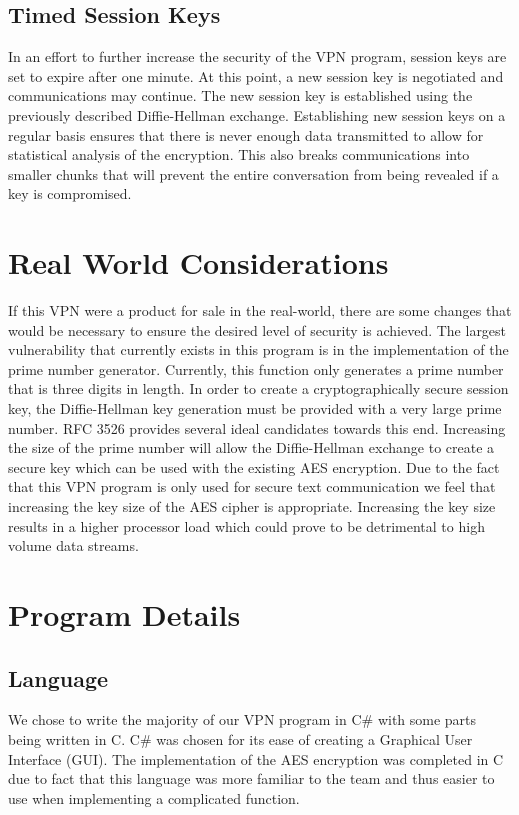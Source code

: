 \documentclass[journal]{IEEEtran}
\begin{document}
\subsection*{Timed Session Keys}
In an effort to further increase the security of the VPN program, session keys are set to expire after one minute. At this point, a new session key is negotiated and communications may continue. The new session key is established using the previously described Diffie-Hellman exchange. Establishing new session keys on a regular basis ensures that there is never enough data transmitted to allow for statistical analysis of the encryption. This also breaks communications into smaller chunks that will prevent the entire conversation from being revealed if a key is compromised.

\section{Real World Considerations}
If this VPN were a product for sale in the real-world, there are some changes that would be necessary to ensure the desired level of security is achieved. The largest vulnerability that currently exists in this program is in the implementation of the prime number generator. Currently, this function only generates a prime number that is three digits in length. In order to create a cryptographically secure session key, the Diffie-Hellman key generation must be provided with a very large prime number. RFC 3526 provides several ideal candidates towards this end\cite{RFC3526}. Increasing the size of the prime number will allow the Diffie-Hellman exchange to create a secure key which can be used with the existing AES encryption. Due to the fact that this VPN program is only used for secure text communication we feel that increasing the key size of the AES cipher is appropriate. Increasing the key size results in a higher processor load which could prove to be detrimental to high volume data streams. 

\section{Program Details}
\subsection*{Language}
We chose to write the majority of our VPN program in C\# with some parts being written in C. C\# was chosen for its ease of creating a Graphical User Interface (GUI). The implementation of the AES encryption was completed in C due to fact that this language was more familiar to the team and thus easier to use when implementing a complicated function. 
\end{document}
